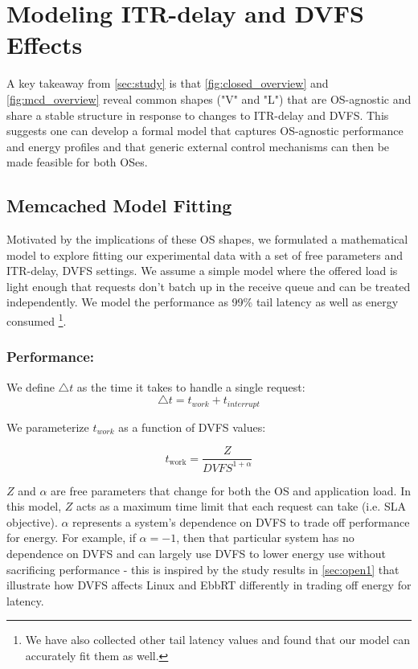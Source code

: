 \section{Modeling ITR-delay and DVFS Effects}
\label{sec:model}
A key takeaway from \cref{sec:study} is that \cref{fig:closed_overview} and \cref{fig:mcd_overview} reveal common shapes ("V" and "L") that are OS-agnostic and share a stable structure in response to changes to ITR-delay and DVFS. This suggests one can develop a formal model that captures OS-agnostic performance and energy profiles and that generic external control mechanisms can then be made feasible for both OSes.

\subsection{Memcached Model Fitting}
Motivated by the implications of these OS shapes, we formulated a mathematical model to explore fitting our experimental data with a set of free parameters and ITR-delay, DVFS settings. We assume a simple model where the offered load is light enough that requests don't batch up in the receive queue and can be treated independently. We model the performance as 99\% tail latency as well as energy consumed \footnote{We have also collected other tail latency values and found that our model can accurately fit them as well.}. 

\subsubsection{Performance:} We define $\triangle t$ as the time it takes to handle a single request:
$$ \triangle t = t_{work} + t_{interrupt} $$

We parameterize $t_{work}$ as a function of DVFS values:

\begin{equation} \label{eq:t_work}
t_{\text{work}} = \frac{Z}{DVFS^{1+\alpha}}
\end{equation}

$Z$ and $\alpha$ are free parameters that change for both the OS and application load. In this model, $Z$ acts as a maximum time limit that each request can take (i.e. SLA objective). $\alpha$ represents a system's dependence on DVFS to trade off performance for energy. For example, if $\alpha = -1$, then that particular system has no dependence on DVFS and can largely use DVFS to lower energy use without sacrificing performance - this is inspired by the study results in \cref{sec:open1} that illustrate how DVFS affects Linux and EbbRT differently in trading off energy for latency.


